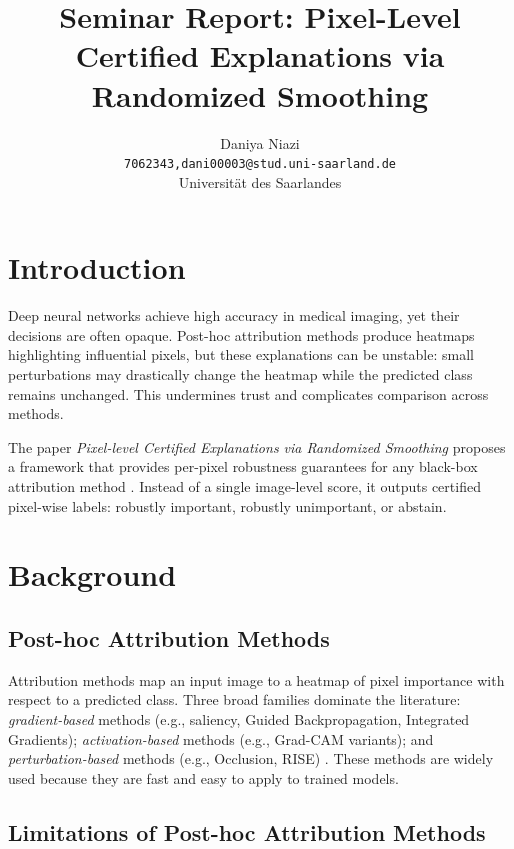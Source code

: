 \documentclass[11pt]{article}
\title{Seminar Report: Pixel-Level Certified Explanations via Randomized Smoothing}
\author{Daniya Niazi \\
\texttt{7062343,dani00003@stud.uni-saarland.de} \\
Universit{\"a}t des Saarlandes}
\date{}
\begin{document}
\maketitle
% 

\section{Introduction}

Deep neural networks achieve high accuracy in medical imaging, yet their decisions are often opaque. Post-hoc attribution methods produce heatmaps highlighting influential pixels, but these explanations can be unstable: small perturbations may drastically change the heatmap while the predicted class remains unchanged. This undermines trust and complicates comparison across methods. 

The paper \emph{Pixel-level Certified Explanations via Randomized Smoothing} proposes a framework that provides per-pixel robustness guarantees for any black-box attribution method \cite{anani2025pixel}. Instead of a single image-level score, it outputs certified pixel-wise labels: robustly important, robustly unimportant, or abstain.


\section{Background}
\subsection{Post-hoc Attribution Methods}
Attribution methods map an input image to a heatmap of pixel importance with respect to a predicted class. Three broad families dominate the literature: \textit{gradient-based} methods (e.g., saliency, Guided Backpropagation, Integrated Gradients); \textit{activation-based} methods (e.g., Grad-CAM variants); and \textit{perturbation-based} methods (e.g., Occlusion, RISE) . These methods are widely used because they are fast and easy to apply to trained models.

\subsection{Limitations of Post-hoc Attribution Methods}
\end{document}
